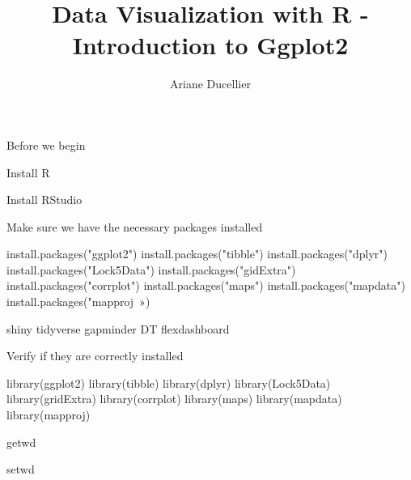 \documentclass{beamer}
\title[Introduction to Ggplot2]{Data Visualization with R - Introduction to Ggplot2}
\author{Ariane Ducellier}
\begin{document}
	\begin{frame}
		\titlepage
	\end{frame}

	\begin{frame}


Before we begin

Install R

Install RStudio

Make sure we have the necessary packages installed

install.packages("ggplot2")
install.packages("tibble")
install.packages("dplyr")
install.packages("Lock5Data")
install.packages("gidExtra")
install.packages("corrplot")
install.packages("maps")
install.packages("mapdata")
install.packages("mapproj »)

shiny
tidyverse
gapminder
DT
flexdashboard

Verify if they are correctly installed

library(ggplot2)
library(tibble)
library(dplyr)
library(Lock5Data)
library(gridExtra)
library(corrplot)
library(maps)
library(mapdata)
library(mapproj)


getwd

setwd

	\end{frame}
\end{document}
